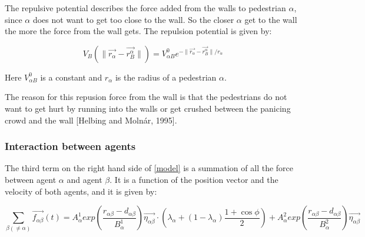The repulsive potential describes the force added from the walls to pedestrian $\alpha$, since $\alpha$ does not
want to get too close to the wall. So the closer $\alpha$ get to the wall the more the force from the wall gets.
The repulsion potential is given by:

\begin{equation}
V_{B} \left( \| \vec{r_{\alpha}} - \vec{r_{B}^{\alpha}} \| \right) =
V^0_{\alpha B} e^{- \| \vec{r_{\alpha}} - \vec{r_{B}^{\alpha}} \| / r_{\alpha} }
\end{equation}

Here $V^0_{\alpha B}$ is a constant and $r_{\alpha}$ is the radius of a pedestrian $\alpha$.

The reason for this repusion force from the wall is that the pedestrians do not want to get hurt by running into the walls
or get crushed between the panicing crowd and the wall [Helbing and Molnár, 1995]. %

\subsubsection{Interaction between agents}
The third term on the right hand side of \eqref{model} is a summation of all the 
force between agent $\alpha$ and agent $\beta$. It is a function of the position vector and the velocity of 
both agents, and it is given by:

\begin{equation}
    \sum_{\beta \left( \neq \alpha \right)}
        \vec{f_{\alpha \beta }}\left( t \right) =
        A_{\alpha}^{1} exp \left(
            \frac{ r_{\alpha \beta} - d_{\alpha \beta }}
                 {B_{\alpha}^1}
        \right)
    \vec{\eta_{\alpha \beta}} \cdot
    \left(
        \lambda_{\alpha} + \left(
            1 - \lambda_{\alpha}
        \right)
		\frac{1+\cos{\phi}}{2}
    \right) +
    A_{\alpha}^{2} exp\left(
        \frac{r_{\alpha \beta} - d_{\alpha \beta}}
             {B_{\alpha}^{2}}
    \right)
    \vec{\eta_{\alpha \beta}}
    \label{agentinteraction}
\end{equation}

